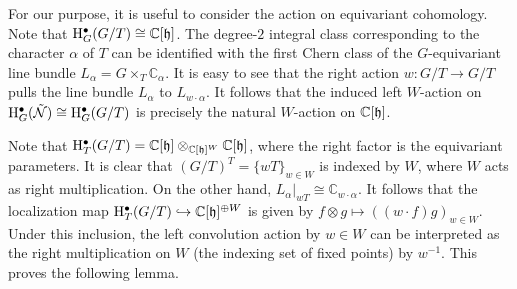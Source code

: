 For our purpose, it is useful to consider the action on equivariant cohomology. Note that $\mathrm{H}^\bullet_G(G/T) \cong \mathbb{C}[\mathfrak{h}]$. The degree-$2$ integral class corresponding to the character $\alpha$ of $T$ can be identified with the first Chern class of the $G$-equivariant line bundle $L_\alpha = G \times_T \mathbb{C}_\alpha$. It is easy to see that the right action $w : G/T \to G/T$ pulls the line bundle $L_\alpha$ to $L_{w \cdot \alpha}$. It follows that the induced left $W$-action on $\mathrm{H}^\bullet_G(\tilde{\mathcal{N}}) \cong \mathrm{H}^\bullet_G(G/T)$ is precisely the natural $W$-action on $\mathbb{C}[\mathfrak{h}]$.

Note that $\mathrm{H}^\bullet_T(G/T) = \mathbb{C}[\mathfrak{h}] \otimes_{\mathbb{C}[\mathfrak{h}]^W} \mathbb{C}[\mathfrak{h}]$, where the right factor is the equivariant parameters. It is clear that $(G/T)^T = \{wT\}_{w \in W}$ is indexed by $W$, where $W$ acts as right multiplication. On the other hand, $L_\alpha|_{wT} \cong \mathbb{C}_{w \cdot \alpha}$. It follows that the localization map $\mathrm{H}^\bullet_T(G/T) \hookrightarrow \mathbb{C}[\mathfrak{h}]^{\oplus W}$ is given by $f \otimes g \mapsto ((w \cdot f) g)_{w \in W}$. Under this inclusion, the left convolution action by $w \in W$ can be interpreted as the right multiplication on $W$ (the indexing set of fixed points) by $w^{-1}$. This proves the following lemma.

